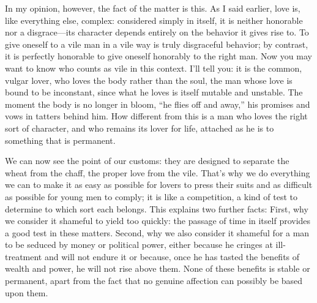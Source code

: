 In my opinion, however, the fact of the matter is this. As I said
earlier, love is, like everything else, complex: considered simply in
itself, it is neither honorable nor a disgrace---its character depends
entirely on the behavior it gives rise to. To give oneself to a vile man
in a vile way is truly disgraceful behavior; by contrast, it is
perfectly honorable to give oneself honorably to the right man. Now you
may want to know who  counts as vile in this context. I'll tell
you: it is the common, vulgar lover, who loves the body rather than the
soul, the man whose love is bound to be inconstant, since what he loves
is itself mutable and unstable. The moment the body is no longer in
bloom, “he flies off and
away,” his promises
and vows in tatters behind him. How different from this is a man who
loves the right sort of character, and who remains its lover for
 life, attached as he is to something that is permanent.

We can now see the point of our customs: they are designed to separate
the wheat from the chaff, the proper love from the vile. That's why we
do everything we can to make it as easy as possible for lovers to press
their suits and as difficult as possible for young men to comply; it is
like a competition, a kind of test to determine to which sort each
belongs. This explains two further facts: First, why we consider it
shameful to yield too quickly: the passage of time in itself provides a
good test in these matters.  Second, why we also consider it
shameful for a man to be seduced by money or political power, either
because he cringes at ill-treatment and will not endure it or because,
once he has tasted the benefits of wealth and power, he will not rise
above them. None of these benefits is stable or permanent, apart from
the fact that no genuine affection can possibly be based upon them.

